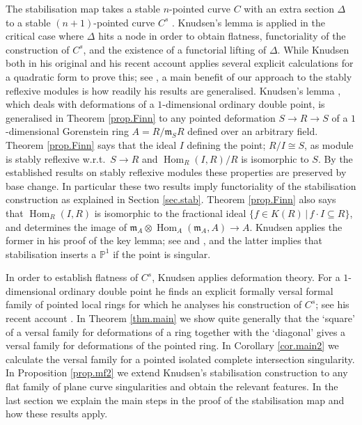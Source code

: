 \documentclass[a4paper,10pt]{amsart}
\theoremstyle{plain}
\theoremstyle{definition}
\theoremstyle{remark}
\numberwithin{equation}{xx}
\DeclareMathOperator{\Hom}{Hom}
\newcommand{\ra}{\rightarrow}
\newcommand{\ot}{{\otimes}}
\newcommand{\sbeq}{\subseteq}
\newcommand{\BB}[1]{\mathbb{{#1}}}
\newcommand{\fr}[1]{\mathfrak{{#1}}}
\newcommand{\hm}[4]{{\Hom}_{#2}^{#1}({#3},{#4})}
\begin{document}
The stabilisation map takes a stable \(n\)-pointed curve \(C\) with an extra section \(\Delta\) to a stable \((n+1)\)-pointed curve \(C^{s}\) \cite[2.4]{knu:83a}. Knudsen's lemma is applied in the critical case where \(\Delta\) hits a node in order to obtain flatness, functoriality of the construction of \(C^{s}\), and the existence of a functorial lifting of \(\Delta\). While Knudsen both in his original and his recent account applies several explicit calculations for a quadratic form to prove this; see \cite{knu:83a,knu:12}, a main benefit of our approach to the stably reflexive modules is how readily his results are generalised. Knudsen's lemma \cite[2.2]{knu:83a}, which deals with deformations of a \(1\)-dimensional ordinary double point, is generalised in Theorem \ref{prop.Finn} to any pointed deformation \(S\ra R\ra S\) of a \(1\)-dimensional Gorenstein ring \(A=R/\fr{m}_{S}R\) defined over an arbitrary field. 
Theorem \ref{prop.Finn} says that the ideal \(I\) defining the point; \(R/I\cong S\), as module is stably reflexive w.r.t.\ \(S\ra R\) and \(\hm{}{R}{I}{R}/R\) is isomorphic to \(S\). By the established results on stably reflexive modules these properties are preserved by base change. In particular these two results imply functoriality of the stabilisation construction as explained in Section \ref{sec.stab}. Theorem \ref{prop.Finn} also says that \(\hm{}{R}{I}{R}\) is isomorphic to the fractional ideal \(\{f\in K(R)\,\vert\, f{\cdot} I\sbeq R\}\), and determines the image of \(\fr{m}_{A}\ot\hm{}{A}{\fr{m}_{A}}{A}\ra A\). Knudsen applies the former in his proof of the key lemma; see \cite[2.2]{knu:83a} and \cite{knu:12}, and the latter implies that stabilisation inserts a \(\BB{P}^{1}\) if the point is singular. 

In order to establish flatness of \(C^{s}\), Knudsen applies deformation theory. For a \(1\)-dimensional ordinary double point he finds an explicit formally versal formal family of pointed local rings for which he analyses his construction of \(C^{s}\); see his recent account \cite{knu:12}. In Theorem \ref{thm.main} we show quite generally that the `square' of a versal family for deformations of a ring together with the `diagonal' gives a versal family for deformations of the pointed ring. In Corollary \ref{cor.main2} we calculate the versal family for a pointed isolated complete intersection singularity. In Proposition \ref{prop.mf2} we extend Knudsen's stabilisation construction to any flat family of plane curve singularities and obtain the relevant features. In the last section we explain the main steps in the proof of the stabilisation map \cite[2.4]{knu:83a} and how these results apply. 
\end{document}
